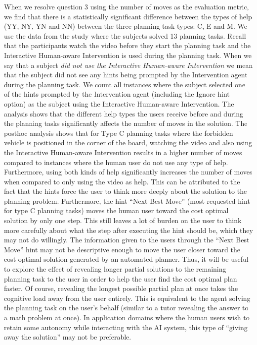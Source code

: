 When we resolve question 3 using the number of moves as the evaluation metric, we find that there is a statistically significant difference between the types of help (YY, NY, YN and NN) between the three planning task types: C, E and M.
We use the data from the study where the subjects solved 13 planning tasks.
Recall that the participants watch the video before they start the planning task and the Interactive Human-aware Intervention is used during the planning task.
When we say that a subject \textit{did not use the Interactive Human-aware Intervention} we mean that the subject did not see any hints being prompted by the Intervention agent during the planning task.
We count all instances where the subject selected one of the hints prompted by the Intervention agent (including the Ignore hint option) as the subject using the Interactive Human-aware Intervention.
The analysis shows that the different help types the users receive before and during the planning tasks significantly affects the number of moves in the solution.
The posthoc analysis shows that for Type C planning tasks where the forbidden vehicle is positioned in the corner of the board, watching the video and also using the Interactive Human-aware Intervention results in a higher number of moves compared to instances where the human user do not use any type of help.
Furthermore, using both kinds of help significantly increases the number of moves when compared to only using the video as help.
This can be attributed to the fact that the hints force the user to think more deeply about the solution to the planning problem.
Furthermore, the hint ``Next Best Move'' (most requested hint for type C planning tasks) moves the human user toward the cost optimal solution by only one step.
This still leaves a lot of burden on  the user to think more carefully about what the step after executing the hint should be, which they may not do willingly.
The information given to the users through the ``Next Best Move'' hint may not be descriptive enough to move the user closer toward the cost optimal solution generated by an automated planner.
Thus, it will be useful to explore the effect of revealing longer partial solutions to the remaining planning task to the user in order to help the user find the cost optimal plan faster.
Of course, revealing the longest possible partial plan at once takes the cognitive load away from the user entirely.
This is equivalent to the agent solving the planning task on the user's behalf (similar to a tutor revealing the answer to a math problem at once).
In application domains where the human users wish to retain some autonomy while interacting with the AI system, this type of ``giving away the solution'' may not be preferable.

